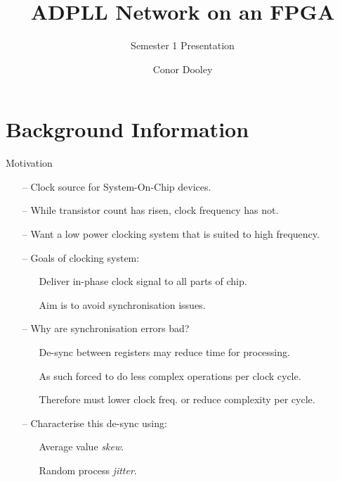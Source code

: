 \documentclass{beamer}
\title{ADPLL Network on an FPGA}
\author{Conor Dooley}
\subtitle{Semester 1 Presentation}
\begin{document}
\begin{frame}
    \titlepage
\end{frame}

\section*{Background Information}
\begin{frame}{Motivation}

    \begin{itemize}
        \item[--]
            Clock source for System-On-Chip devices.
        \item[--]
        	While transistor count has risen, clock frequency has not.
        \item[--]
        	Want a low power clocking system that is suited to high frequency.
        \item[--]
            Goals of clocking system:
            \begin{itemize}
            	\item[]
            		Deliver in-phase clock signal to all parts of chip.
		        \item[]
		            Aim is to avoid synchronisation issues.
		    \end{itemize}
        \item[--]
            Why are synchronisation errors bad?
        \begin{itemize}
        	\item[]
        		De-sync between registers may reduce time for processing.
            \item[]
                As such forced to do less complex operations per clock cycle.
            \item[]
                Therefore must lower clock freq. or reduce complexity per cycle.
        \end{itemize}
    	\item[--]
    		Characterise this de-sync using:
    		\begin{itemize}
    			\item[]
    				Average value \textit{skew}.
    			\item[]
	    			Random process \textit{jitter}.
    		\end{itemize}
    \end{itemize}
 
\end{frame}
\end{document}
